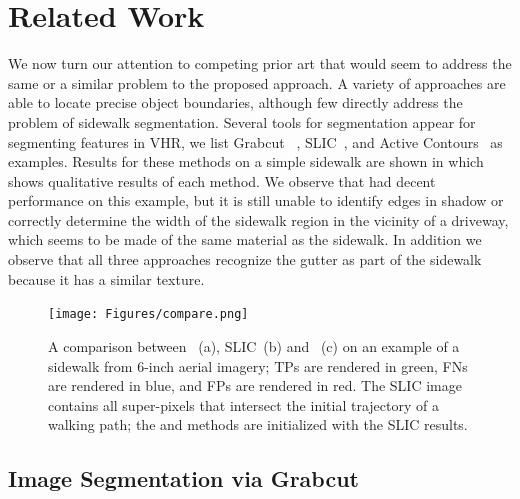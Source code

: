 \chapter{Related Work}

We now turn our attention to competing prior art that would seem to address the same or a similar problem to the proposed approach. 
A variety of approaches are able to locate precise object boundaries, although few directly address
the problem of sidewalk segmentation. Several tools for segmentation
appear for segmenting features in \ac{VHR}, we list Grabcut ~\cite{Rother2004-ou},
SLIC~\cite{Achanta:149300}, and Active Contours~\cite{Kass88snakes:active} as examples. 
Results for
these methods on a simple sidewalk are shown in  which shows
qualitative results of each method. We observe that \GrabCut{} had decent performance on this example,
but it is still unable to identify edges in shadow or correctly determine the width of the sidewalk
region in the vicinity of a driveway, which seems to be made of the same material as the sidewalk.
In addition we observe that all three approaches recognize the gutter as part of the sidewalk
because it has a similar texture.

\begin{figure}[H]
    \centering
    \texttt{[image: Figures/compare.png]}
    \caption[Method comparison with Grabcut, Active Contours, and Slic]{
        A comparison between \GrabCut{}~(a), SLIC~(b) and \ActiveContours{}~(c) 
        on an example of a sidewalk from 6-inch aerial imagery; 
        \aclp{TP} are rendered in green, 
        \aclp{FN} are rendered in blue, and 
        \aclp{FP} are rendered in red.
        The SLIC image contains all super-pixels that intersect 
        the initial trajectory of a walking path; 
        the \ActiveContours{} and \GrabCut{} methods are initialized with the SLIC results.
    }
    \label{fig:Method_comparison}
\end{figure}

\section{Image Segmentation via Grabcut} 


